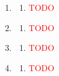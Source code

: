 \begin{enumerate}[label=(\roman*)]

    \item 

        \begin{multicols}{2}
        \begin{enumerate}[label=(\alph*)]
            \setlength\itemsep{0em}
            \item \textcolor{red}{TODO} 
        \end{enumerate}
        \end{multicols}

    \item 

        \begin{multicols}{2}
        \begin{enumerate}[label=(\alph*)]
            \setlength\itemsep{0em}
            \item \textcolor{red}{TODO} 
        \end{enumerate}
        \end{multicols}

    \item 

        \begin{multicols}{2}
        \begin{enumerate}[label=(\alph*)]
            \setlength\itemsep{0em}
            \item \textcolor{red}{TODO} 
        \end{enumerate}
        \end{multicols}

    \item 

        \begin{multicols}{2}
        \begin{enumerate}[label=(\alph*)]
            \setlength\itemsep{0em}
            \item \textcolor{red}{TODO} 
        \end{enumerate}
        \end{multicols}


\end{enumerate}
